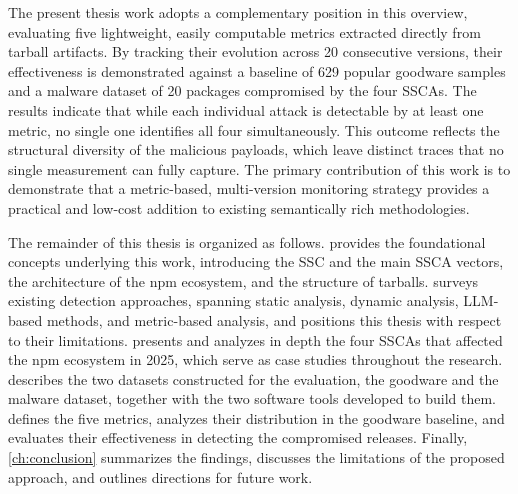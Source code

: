 The present thesis work adopts a complementary position in this overview, 
evaluating five lightweight, easily computable metrics extracted directly from tarball artifacts.
By tracking their evolution across 20 consecutive versions, 
their effectiveness is demonstrated against a baseline of 629 popular goodware samples 
and a malware dataset of 20 packages compromised by the four \acp{SSCA}.
The results indicate that while each individual attack is detectable by at least one metric,
no single one identifies all four simultaneously.
This outcome reflects the structural diversity of the malicious payloads,
which leave distinct traces that no single measurement can fully capture.
The primary contribution of this work is to demonstrate that a metric-based, 
multi-version monitoring strategy provides a practical and low-cost addition to existing semantically rich methodologies.

The remainder of this thesis is organized as follows.
 provides the foundational concepts underlying this work,
introducing the \ac{SSC} and the main \ac{SSCA} vectors, 
the architecture of the \ac{npm} ecosystem, 
and the structure of tarballs.
 surveys existing detection approaches,
spanning static analysis, dynamic analysis, \ac{LLM}-based methods, and metric-based analysis,
and positions this thesis with respect to their limitations.
 presents and analyzes in depth the four \acp{SSCA} 
that affected the \ac{npm} ecosystem in 2025, which serve as case studies throughout the research.
 describes the two datasets constructed for the evaluation,
the goodware and the malware dataset,
together with the two software tools developed to build them.
 defines the five metrics, 
analyzes their distribution in the goodware baseline, 
and evaluates their effectiveness in detecting the compromised releases.
Finally, \cref{ch:conclusion} summarizes the findings, discusses the limitations of the proposed approach,
and outlines directions for future work.